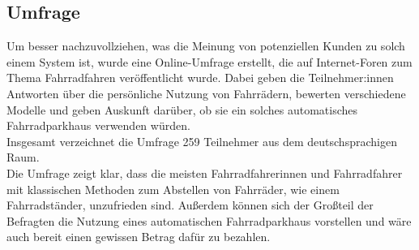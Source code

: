 \subsection{Umfrage}
Um besser nachzuvollziehen, was die Meinung von potenziellen Kunden zu solch einem System ist, wurde eine Online-Umfrage erstellt, die auf Internet-Foren zum Thema Fahrradfahren veröffentlicht wurde. Dabei geben die Teilnehmer:innen Antworten über die persönliche Nutzung von Fahrrädern, bewerten verschiedene Modelle und geben Auskunft darüber, ob sie ein solches automatisches Fahrradparkhaus verwenden würden.\\
Insgesamt verzeichnet die Umfrage 259 Teilnehmer aus dem deutschsprachigen Raum. \\
Die Umfrage zeigt klar, dass die meisten Fahrradfahrerinnen und Fahrradfahrer mit klassischen Methoden zum Abstellen von Fahrräder, wie einem Fahrradständer, unzufrieden sind. Außerdem können sich der Großteil der Befragten die Nutzung eines automatischen Fahrradparkhaus vorstellen und wäre auch bereit einen gewissen Betrag dafür zu bezahlen.
